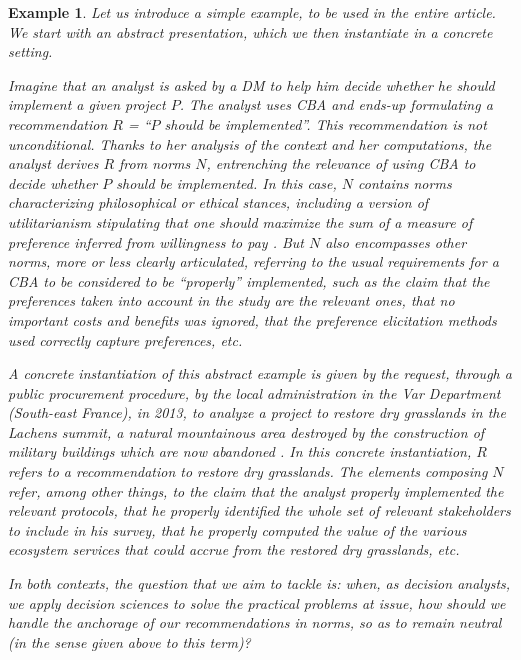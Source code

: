 \documentclass[preprint, french, english, 11pt, authoryear]{elsarticle}%
\newtheorem{example}{Example}
\begin{document}
\begin{example}
Let us introduce a simple example, to be used in the entire article. %
We start with an abstract presentation, which we then instantiate in a concrete setting.

Imagine that an analyst is asked by a \ac{DM} to help him decide whether he should implement a given project $P$.
The analyst uses \ac{CBA} \citep{layard_cost-benefit_1994} and ends-up formulating a recommendation $R$ = “$P$ should be implemented”.
This recommendation is not unconditional.
Thanks to her analysis of the context and her computations, the analyst derives $R$ from norms $N$, entrenching the relevance of using \ac{CBA} to decide whether $P$ should be implemented.
In this case, $N$ contains norms characterizing philosophical or ethical stances, including a version of utilitarianism stipulating that one should maximize the sum of a measure of preference inferred from willingness to pay \citep{meinard_ethical_2016}. 
But $N$ also encompasses other norms, more or less clearly articulated, referring to the usual requirements for a \ac{CBA} to be considered to be ``properly'' implemented, such as the claim that the preferences taken into account in the study are the relevant ones,
that no important costs and benefits was ignored, that the preference elicitation methods used correctly capture preferences, etc.

A concrete instantiation of this abstract example is given by the request, through a public procurement procedure, by the local administration in the Var Department (South-east France), in 2013, to analyze a project to restore dry grasslands in the Lachens summit, 
a natural mountainous area destroyed by the construction of military buildings which are now abandoned \citep{meinard_etude_2015}.
In this concrete instantiation, $R$ refers to a recommendation to restore dry grasslands. 
The elements composing $N$ refer, among other things, to the claim that the analyst properly implemented the relevant protocols, 
that he properly identified the whole set of relevant stakeholders to include in his survey, that he properly computed the value of the various ecosystem services that could accrue from the restored dry grasslands, etc.

In both contexts, the question that we aim to tackle is: when, as decision analysts, we apply decision sciences to solve the practical problems at issue, how should we handle the anchorage of our recommendations in norms, so as to remain neutral (in the sense given above to this term)?
\end{example}
\end{document}
